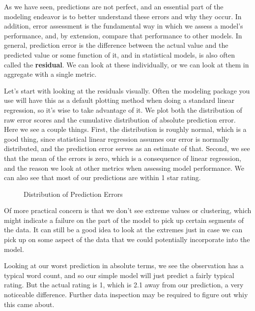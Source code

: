 \documentclass[
  letterpaper,
]{krantz}
\begin{document}
As we have seen, predictions are not perfect, and an essential part of
the modeling endeavor is to better understand these errors and why they
occur. In addition, error assessment is the fundamental way in which we
assess a model's performance, and, by extension, compare that
performance to other models. In general, prediction error is the
difference between the actual value and the predicted value or some
function of it, and in statistical models, is also often called the
\textbf{residual}. We can look at these individually, or we can look at
them in aggregate with a single metric.

Let's start with looking at the residuals visually. Often the modeling
package you use will have this as a default plotting method when doing a
standard linear regression, so it's wise to take advantage of it. We
plot both the distribution of raw error scores and the cumulative
distribution of absolute prediction error. Here we see a couple things.
First, the distribution is roughly normal, which is a good thing, since
statistical linear regression assumes our error is normally distributed,
and the prediction error serves as an estimate of that. Second, we see
that the mean of the errors is zero, which is a consequence of linear
regression, and the reason we look at other metrics when assessing model
performance. We can also see that most of our predictions are within 1
star rating.

\begin{figure}[H]


\caption{\label{fig-my-first-model-error-plot}Distribution of Prediction
Errors}

\end{figure}%

Of more practical concern is that we don't see extreme values or
clustering, which might indicate a failure on the part of the model to
pick up certain segments of the data. It can still be a good idea to
look at the extremes just in case we can pick up on some aspect of the
data that we could potentially incorporate into the model.

Looking at our worst prediction in absolute terms, we see the
observation has a typical word count, and so our simple model will just
predict a fairly typical rating. But the actual rating is 1, which is
2.1 away from our prediction, a very noticeable difference. Further data
inspection may be required to figure out whiy this came about.
\end{document}

